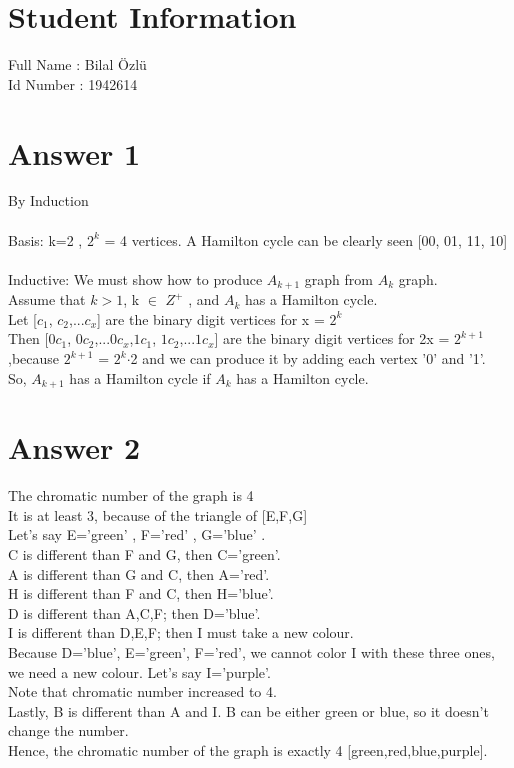 \documentclass[12pt]{article}
\begin{document}
\section*{Student Information } 
Full Name : Bilal Özlü \\
Id Number :  1942614 \\

\section*{Answer 1}
 By Induction \\
 \\
 Basis: k=2 , $2^k$ = 4 vertices. A Hamilton cycle can be clearly seen [00, 01, 11, 10] \\
 \\
 Inductive: We must show how to produce $A_{k+1}$ graph from $A_k$ graph. \\
 Assume that $k>1$, k $\in$ $Z^+$ , and $A_k$ has a Hamilton cycle. \\
 Let [$c_1$, $c_2$,...$c_x$] are the binary digit vertices for x = $2^k$ \\
 Then [0$c_1$, 0$c_2$,...$0c_x$,$1c_1$, $1c_2$,...$1c_x$] are the binary digit vertices for 2x = $2^{k+1}$ ,because $2^{k+1}$ = $2^k$$\cdot$2 and we can produce it by adding each vertex '0' and '1'. \\
 So, $A_{k+1}$ has a Hamilton cycle if $A_k$ has a Hamilton cycle. \\ 

\section*{Answer 2}
 The chromatic number of the graph is 4 \\
 It is at least 3, because of the triangle of [E,F,G] \\
 Let's say E='green' , F='red' , G='blue' . \\
 C is different than F and G, then C='green'. \\
 A is different than G and C, then A='red'. \\
 H is different than F and C, then H='blue'. \\
 D is different than A,C,F; then D='blue'. \\
 I is different than D,E,F; then I must take a new colour. \\
 Because D='blue', E='green', F='red', we cannot color I with these three ones, we need a new colour. Let's say I='purple'. \\
 Note that chromatic number increased to 4. \\
 Lastly, B is different than A and I. B can be either green or blue, so it doesn't change the number. \\
 Hence, the chromatic number of the graph is exactly 4 [green,red,blue,purple]. \\ 
\end{document}
